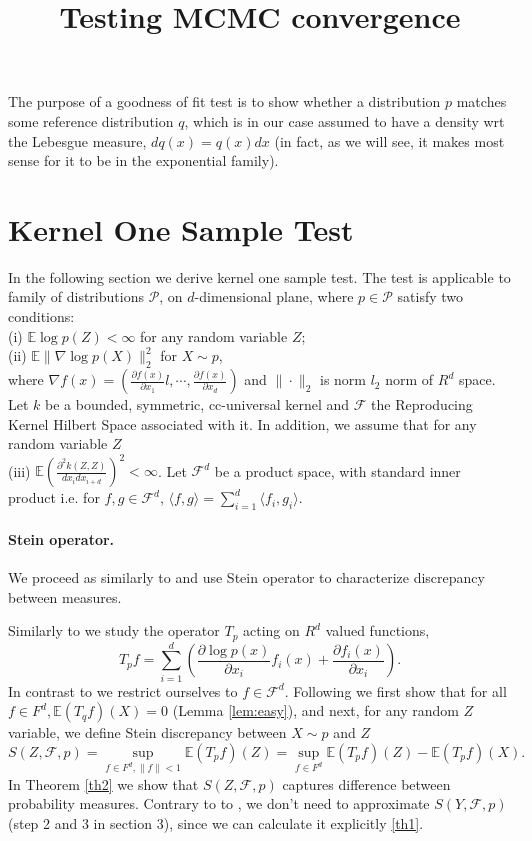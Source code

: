 \documentclass{article}
\title{Testing MCMC convergence}
\author{}
\date{}
\newcommand{\ev}{\mathbb{E}}
\begin{document}
\maketitle

The purpose of a goodness of fit test is to show whether a distribution
$p$ matches some reference distribution $q$, which is in our case
assumed to have a density wrt the Lebesgue measure, $dq(x)=q(x)dx$
(in fact, as we will see, it makes most sense for it to be in the
exponential family).

\section{Kernel One Sample Test}
In the following section we derive kernel one sample test. The test is applicable to family of distributions $\mathcal{P}$, on $d$-dimensional plane, where $p \in \mathcal{P}$ satisfy two conditions: \\ 
(i) $\ev \log p(Z)    <\infty$ for any random variable $Z$; \\
(ii) $\ev   \| \nabla \log p(X) \|^2_2  $  for $X \sim p$,\\
where $\nabla f(x) = \left( \frac{\partial f(x)} {\partial x_1}l, \cdots, \frac{\partial f(x)} {\partial x_d} \right)$ and $\| \cdot \|_2$ is norm $l_2$ norm of $R^d$ space. Let $k$ be a bounded, symmetric, cc-universal \cite{sriperumbudur2011universality}  kernel  and $\mathcal{F}$  the Reproducing Kernel Hilbert Space  associated with it. In addition, we assume that for any random variable $Z$ \\ 
(iii) $\ev \left(\frac{\partial^{2} k(Z,Z) }{dx_i dx_{i+d} }\right)^2<\infty$. Let $\mathcal{F}^d$ be a product space, with standard inner product i.e. for $f,g \in \mathcal{F}^d$,  $\langle f,g \rangle = \sum_{i=1}^d \langle f_i,g_i \rangle$.


\paragraph{Stein operator.}
We proceed as similarly to \cite{mackey2015multivariate,stein1972} and use Stein operator to characterize discrepancy between measures.


Similarly to \cite{mackey2015multivariate} we study the operator $T_p$ acting on $R^d$ valued functions, 
\[
T_{p} f=  \sum_{i=1}^{d} \left( \frac{\partial \log p(x)}{ \partial x_i} f_i(x)+\frac{\partial f_i(x)}{ \partial x_i} \right).
\]
In contrast to \cite{mackey2015multivariate} we restrict ourselves  to $f \in \mathcal{F}^d$. Following \cite{mackey2015multivariate} we first show  that for all $f \in F^d, \ev (T_{q}f)(X) = 0$ (Lemma \ref{lem:easy}), and next, for any random $Z$ variable, we define Stein discrepancy between $X \sim p$ and $Z$ 
\[
 S(Z,\mathcal{F},p) = \sup_{f \in F^d,\| f \|<1} \ev (T_{p}f) (Z)  = \sup_{ f \in F^d } \ev (T_{p}f)(Z) - \ev (T_{p}f) (X).
\]
In Theorem \ref{th2} we show that  $S(Z,\mathcal{F},p)$ captures difference between probability measures. Contrary to to \cite{mackey2015multivariate}, we don't need to approximate $S(Y,\mathcal{F},p)$ (step 2 and 3 in section 3), since we can calculate it explicitly \ref{th1}. 
\end{document}
